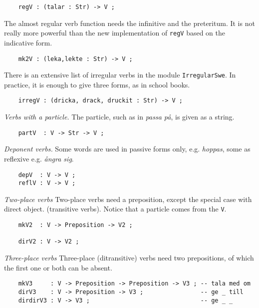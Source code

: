 \documentclass[11pt,a4paper]{article}
\newcommand{\subsubsubsection}[1]{\textit{#1}}
\begin{document}
\begin{verbatim}
    regV : (talar : Str) -> V ;
\end{verbatim}

The almost regular verb function needs the infinitive and the preteritum.
It is not really more powerful than the new implementation of
\texttt{regV} based on the indicative form.

\begin{verbatim}
    mk2V : (leka,lekte : Str) -> V ;
\end{verbatim}

There is an extensive list of irregular verbs in the module \texttt{IrregularSwe}.
In practice, it is enough to give three forms, as in school books.

\begin{verbatim}
    irregV : (dricka, drack, druckit : Str) -> V ;
\end{verbatim}

\subsubsubsection{Verbs with a particle.}
The particle, such as in \textit{passa på}, is given as a string.

\begin{verbatim}
    partV  : V -> Str -> V ;
\end{verbatim}

\subsubsubsection{Deponent verbs.}
Some words are used in passive forms only, e.g. \textit{hoppas}, some as
reflexive e.g. \textit{ångra sig}.

\begin{verbatim}
    depV  : V -> V ;
    reflV : V -> V ;
\end{verbatim}

\subsubsubsection{Two-place verbs}
Two-place verbs need a preposition, except the special case with direct object.
(transitive verbs). Notice that a particle comes from the \texttt{V}.

\begin{verbatim}
    mkV2  : V -> Preposition -> V2 ;
  
    dirV2 : V -> V2 ;
\end{verbatim}

\subsubsubsection{Three-place verbs}
Three-place (ditransitive) verbs need two prepositions, of which
the first one or both can be absent.

\begin{verbatim}
    mkV3     : V -> Preposition -> Preposition -> V3 ; -- tala med om
    dirV3    : V -> Preposition -> V3 ;                -- ge _ till
    dirdirV3 : V -> V3 ;                               -- ge _ _
\end{verbatim}
\end{document}
